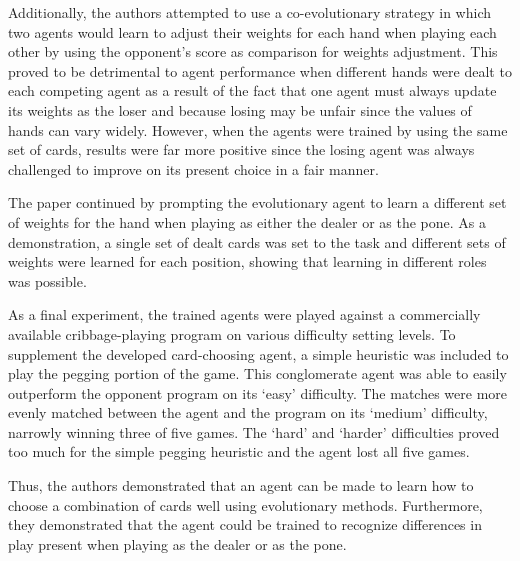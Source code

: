 Additionally,
the authors attempted to use a co-evolutionary strategy in which
two agents would learn to adjust their weights for each hand when playing each
other by using the opponent's score as comparison for weights adjustment.
%
This proved to be detrimental to agent performance when different hands were
dealt to each competing agent
as a result of the fact that one agent must always update its weights
as the loser
and because losing may be unfair since the values of hands can vary widely.
%
However,
when the agents were trained by using the same set of cards,
results were far more positive since the losing agent was always challenged to
improve on its present choice in a fair manner.

The paper continued by prompting the evolutionary agent to learn a different set
of weights for the hand
when playing as either the dealer or as the pone.
%
As a demonstration,
a single set of dealt cards was set to the task
and different sets of weights were learned for each position,
showing that learning in different roles was possible.

As a final experiment,
the trained agents were played against a commercially available cribbage-playing
program on various difficulty setting levels.
%
To supplement the developed card-choosing agent,
a simple heuristic was included to play the pegging portion of the game.
%
This conglomerate agent was able to easily outperform the opponent program
on its `easy' difficulty.
%
The matches were more evenly matched between the agent and the program on
its `medium' difficulty,
narrowly winning three of five games.
%
The `hard' and `harder' difficulties proved too much for the simple pegging
heuristic
and the agent lost all five games.

Thus,
the authors demonstrated that an agent can be made to learn how to choose a
combination of cards well using evolutionary methods.
%
Furthermore,
they demonstrated that the agent could be trained to recognize differences
in play present when playing as the dealer or as the pone.

